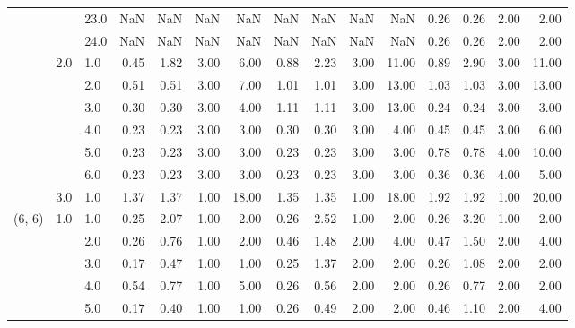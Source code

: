 \begin{tabular}{lllrrrrrrrrrrrr}
       &     & 23.0 &        NaN &       NaN &  NaN &    NaN &        NaN &       NaN &   NaN &    NaN &       0.26 &      0.26 &  2.00 &   2.00 \\
       &     & 24.0 &        NaN &       NaN &  NaN &    NaN &        NaN &       NaN &   NaN &    NaN &       0.26 &      0.26 &  2.00 &   2.00 \\
       & 2.0 & 1.0  &       0.45 &      1.82 & 3.00 &   6.00 &       0.88 &      2.23 &  3.00 &  11.00 &       0.89 &      2.90 &  3.00 &  11.00 \\
       &     & 2.0  &       0.51 &      0.51 & 3.00 &   7.00 &       1.01 &      1.01 &  3.00 &  13.00 &       1.03 &      1.03 &  3.00 &  13.00 \\
       &     & 3.0  &       0.30 &      0.30 & 3.00 &   4.00 &       1.11 &      1.11 &  3.00 &  13.00 &       0.24 &      0.24 &  3.00 &   3.00 \\
       &     & 4.0  &       0.23 &      0.23 & 3.00 &   3.00 &       0.30 &      0.30 &  3.00 &   4.00 &       0.45 &      0.45 &  3.00 &   6.00 \\
       &     & 5.0  &       0.23 &      0.23 & 3.00 &   3.00 &       0.23 &      0.23 &  3.00 &   3.00 &       0.78 &      0.78 &  4.00 &  10.00 \\
       &     & 6.0  &       0.23 &      0.23 & 3.00 &   3.00 &       0.23 &      0.23 &  3.00 &   3.00 &       0.36 &      0.36 &  4.00 &   5.00 \\
       & 3.0 & 1.0  &       1.37 &      1.37 & 1.00 &  18.00 &       1.35 &      1.35 &  1.00 &  18.00 &       1.92 &      1.92 &  1.00 &  20.00 \\
(6, 6) & 1.0 & 1.0  &       0.25 &      2.07 & 1.00 &   2.00 &       0.26 &      2.52 &  1.00 &   2.00 &       0.26 &      3.20 &  1.00 &   2.00 \\
       &     & 2.0  &       0.26 &      0.76 & 1.00 &   2.00 &       0.46 &      1.48 &  2.00 &   4.00 &       0.47 &      1.50 &  2.00 &   4.00 \\
       &     & 3.0  &       0.17 &      0.47 & 1.00 &   1.00 &       0.25 &      1.37 &  2.00 &   2.00 &       0.26 &      1.08 &  2.00 &   2.00 \\
       &     & 4.0  &       0.54 &      0.77 & 1.00 &   5.00 &       0.26 &      0.56 &  2.00 &   2.00 &       0.26 &      0.77 &  2.00 &   2.00 \\
       &     & 5.0  &       0.17 &      0.40 & 1.00 &   1.00 &       0.26 &      0.49 &  2.00 &   2.00 &       0.46 &      1.10 &  2.00 &   4.00 \\

\end{tabular}
